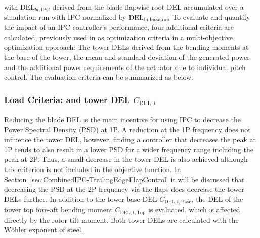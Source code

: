 with $\text{DEL}_{bi,\text{IPC}}$ derived from the blade flapwise root DEL accumulated over a simulation run with IPC normalized by $\text{DEL}_{\text{bi,\text{baseline}}}$ 
To evaluate and quantify the impact of an IPC controller's performance, four additional criteria are calculated, previously used in \cite{hoffmann2018load} as optimization criteria in a multi-objective optimization approach: The tower DELs derived from the bending moments at the base of the tower, the mean and standard deviation of the generated power and the additional power requirements of the actuator due to individual pitch control. The evaluation criteria can be summarized as below.

\subsubsection*{Load Criteria:  and tower DEL $C_{\text{DEL},t}$}
Reducing the blade DEL is the main incentive for using IPC to decrease the Power Spectral Density (PSD) at 1P. A reduction at the 1P frequency does not influence the tower DEL, however, finding a controller that decreases the peak at 1P tends to also result in a lower PSD for a wider frequency range including the peak at 2P. Thus, a small decrease in the tower DEL is also achieved although this criterion is not included in the objective function. In Section~\ref{sec:CombinedIPC-TrailingEdgeFlapControl} it will be discussed that decreasing the PSD at the 2P frequency via the flaps does decrease the tower DELs further. In addition to the tower base DEL $C_{\text{DEL},t,\text{Base}}$, the DEL of the tower top fore-aft bending moment $C_{\text{DEL},t,\text{Top}}$ is evaluated, which is affected directly by the rotor tilt moment. Both tower DELs are calculated with the Wöhler exponent of steel. 


